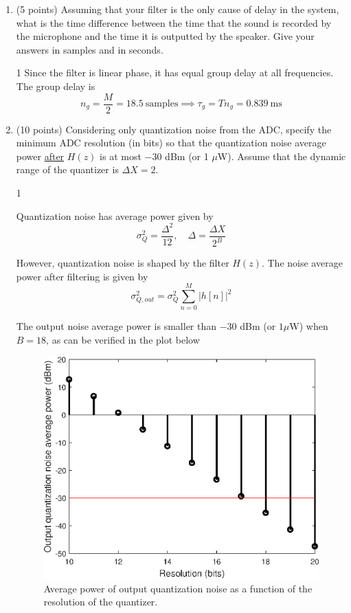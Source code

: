 \documentclass[10pt]{article}
\def\SOLUTIONS{0} %
\def\SolutionsColor{red2}
\begin{document}
\begin{enumerate}[label=(\alph*)]
	\item (5 points) Assuming that your filter is the only cause of delay in the system, what is the time difference between the time that the sound is recorded by the microphone and the time it is outputted by the speaker. Give your answers in samples and in seconds. 
	
	\if\SOLUTIONS1 {\color{\SolutionsColor} Since the filter is linear phase, it has equal group delay at all frequencies. The group delay is
		\begin{equation*}
		n_g = \frac{M}{2} = 18.5~\text{samples} \implies \tau_g = Tn_g = 0.839~\text{ms}
		\end{equation*}	
	}\fi
	
	\item (10 points) Considering only quantization noise from the ADC, specify the minimum ADC resolution (in bits) so that the quantization noise average power \underline{after} $H(z)$ is at most $-30$ dBm (or 1 $\mu$W). Assume that the dynamic range of the quantizer is $\Delta X = 2$.
	
	\if\SOLUTIONS1 {\color{\SolutionsColor} Quantization noise has average power given by
		\begin{equation*}
		\sigma_Q^2 = \frac{\Delta^2}{12}, \quad \Delta = \frac{\Delta X}{2^B}
		\end{equation*}
		
		However, quantization noise is shaped by the filter $H(z)$. The noise average power after filtering is given by
		\begin{equation*}
		\sigma^2_{Q, out} = \sigma_Q^2\sum_{n = 0}^{M}|h[n]|^2 \tag{quantization noise shaping}
		\end{equation*}
		
		The output noise average power is smaller than $-30$ dBm (or $1 \mu$W) when $B = 18$, as can be verified in the plot below
		
		\FloatBarrier
		\begin{figure}[h!]
			\centering
			\includegraphics[scale=0.6]{figs/hearing_aid_quant_noise_var.eps}
			\caption{Average power of output quantization noise as a function of the resolution of the quantizer.}
		\end{figure}
		\FloatBarrier	
		
}
\end{enumerate}
\end{document}
